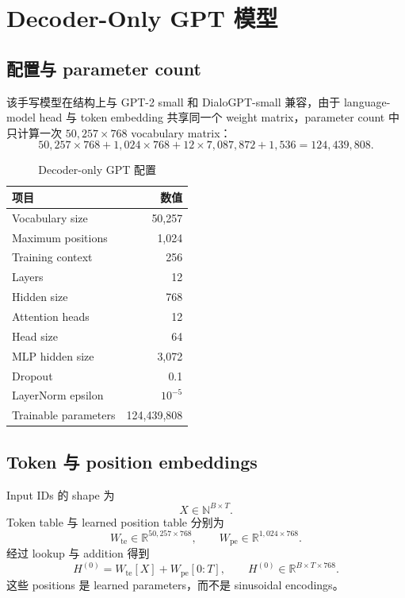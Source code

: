 \documentclass[12pt]{article}
\newcommand{\RSpace}{\mathbb R}
\begin{document}
\section{Decoder-Only GPT 模型}

\subsection{配置与 parameter count}

该手写模型在结构上与 GPT-2 small 和 DialoGPT-small 兼容，由于 language-model head 与 token embedding 共享同一个 weight matrix，parameter count 中只计算一次 $50{,}257\times768$ vocabulary matrix：
\begin{equation}
50{,}257\times768+1{,}024\times768
+12\times7{,}087{,}872+1{,}536
=124{,}439{,}808.
\end{equation}
\begin{table}[htbp]
\centering
\caption{Decoder-only GPT 配置}
\label{tab:model-config}
\begin{tabular}{lr}
\toprule
项目 & 数值\\
\midrule
Vocabulary size & 50,257\\
Maximum positions & 1,024\\
Training context & 256\\
Layers & 12\\
Hidden size & 768\\
Attention heads & 12\\
Head size & 64\\
MLP hidden size & 3,072\\
Dropout & 0.1\\
LayerNorm epsilon & $10^{-5}$\\
Trainable parameters & 124,439,808\\
\bottomrule
\end{tabular}
\end{table}

\subsection{Token 与 position embeddings}

Input IDs 的 shape 为
\[
X\in\mathbb N^{B\times T}.
\]
Token table 与 learned position table 分别为
\[
W_{\mathrm{te}}\in\RSpace^{50{,}257\times768},
\qquad
W_{\mathrm{pe}}\in\RSpace^{1{,}024\times768}.
\]
经过 lookup 与 addition 得到
\begin{equation}
H^{(0)}=W_{\mathrm{te}}[X]+W_{\mathrm{pe}}[0:T],
\qquad H^{(0)}\in\RSpace^{B\times T\times768}.
\end{equation}
这些 positions 是 learned parameters，而不是 sinusoidal encodings。
\end{document}
